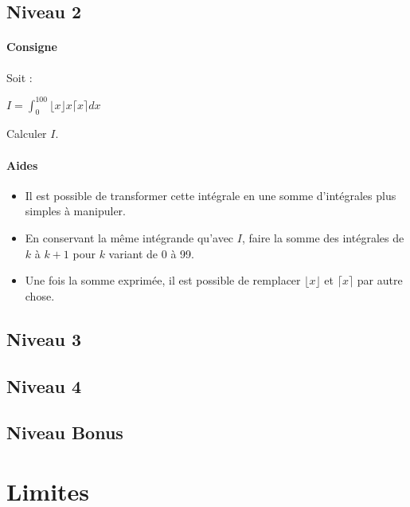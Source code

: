 \documentclass[a4paper]{report}
\begin{document}
			\subsection{Niveau 2}
				\begin{tcolorbox}[colback=white,colframe=black,title=Exercice - Intégrales et arrondis]
					\paragraph{Consigne}
						Soit :
						\begin{center}
							$I = \int_{0}^{100}\lfloor x \rfloor x \lceil x \rceil dx$
						\end{center}
						Calculer $I$.
						
					\tcblower					
					
					\paragraph{Aides}
						\begin{itemize}
							\item Il est possible de transformer cette intégrale en une somme d'intégrales plus simples à manipuler.
							\item En conservant la même intégrande qu'avec $I$, faire la somme des intégrales de $k$ à $k+1$ pour $k$ variant de 0 à 99.	
							\item Une fois la somme exprimée, il est possible de remplacer $\lfloor x \rfloor$ et $\lceil x \rceil$ par autre chose.			
						\end{itemize}	
				\end{tcolorbox}											
		
			\subsection{Niveau 3}
			
			\subsection{Niveau 4}
			
			\subsection{Niveau Bonus}
			
		\section{Limites}
		
\end{document}
